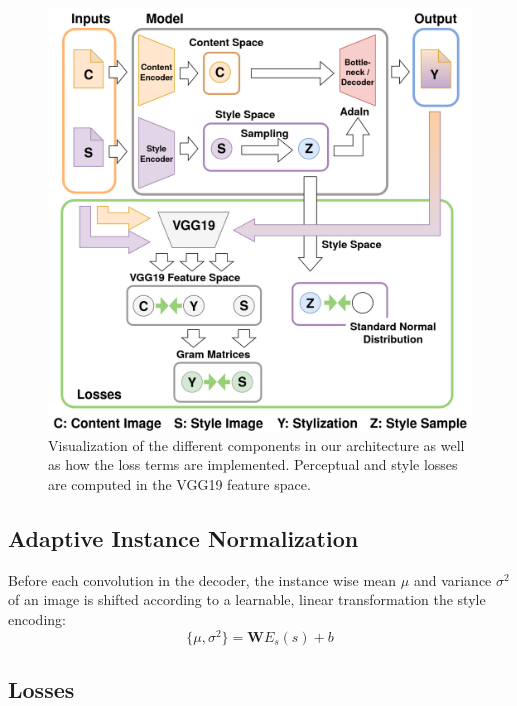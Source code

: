 \documentclass[10pt,twocolumn,letterpaper]{article}
\begin{document}
\begin{figure}
\centering
\includegraphics[width=0.9\linewidth]{pipeline_reduced_semi_verbose.png}
\caption{Visualization of the different components in our architecture as well as how the loss terms are implemented. Perceptual and style losses are computed in the VGG19 feature space.}
\label{fig:model}
\end{figure}
	
\subsection{Adaptive Instance Normalization}

Before each convolution in the decoder, the instance wise mean $\mu$ and variance $\sigma^2$ of an image is shifted according to a learnable, linear transformation the style encoding:
\begin{equation}
\{\mu,\sigma^2\} = \mathbf{W}E_s(s) + b
\end{equation}
	
\subsection{Losses}
\end{document}
